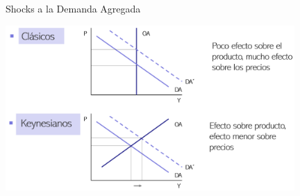 \documentclass{beamer}
\begin{document}
\begin{frame}{Shocks a la Demanda Agregada}
    
\centering\includegraphics[width=11cm]{Slides Principios de Economia/Figures/P21.png}\
    
\end{frame}
\end{document}
